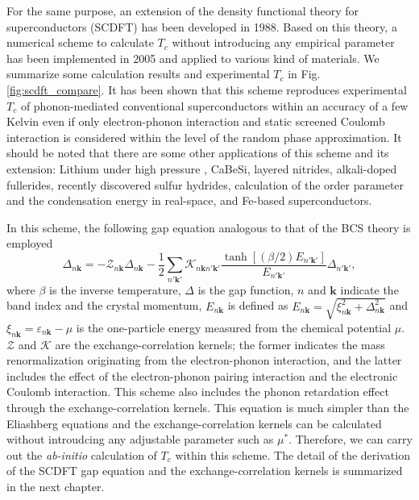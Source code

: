 For the same purpose, an extension of the density functional theory for superconductors (SCDFT)
has been developed in 1988\cite{Oliveira1988}. Based on this theory, a numerical scheme to calculate
$T_c$ without introducing any empirical parameter has been implemented in 2005\cite{Luders2005} 
and applied to various kind of materials. We summarize some calculation results and experimental 
$T_c$ in Fig.\ref{fig:scdft_compare}. It has been shown that this scheme reproduces experimental $T_c$ 
of phonon-mediated conventional superconductors within an accuracy of a few Kelvin even if only electron-phonon 
interaction and static screened Coulomb interaction is considered within the level of the random
phase approximation.
It should be noted that there are some other applications of this scheme and its extension: 
Lithium under high pressure
\cite{Profeta2006Pressure, RA2013}, CaBeSi\cite{Bersier2009CaBeSi}, layered nitrides\cite{RA2012}, 
alkali-doped fullerides\cite{RA2013alkali}, recently discovered sulfur hydrides\cite{Flores2016,RA2015,Errea2015},
calculation of the order parameter and the condensation energy in real-space\cite{Linscheid2015},
and Fe-based superconductors\cite{Essenberger2016}.

In this scheme, the following gap equation analogous to that of the BCS theory is employed
%
\begin{equation}
	\Delta_{n \bm k} = -{\mathcal Z}_{n \bm k}\Delta_{n \bm k} - \frac{1}{2}
	\sum_{n' \bm k'} {\mathcal K}_{n \bm k n' \bm k'} \frac{\tanh[(\beta/2)E_{n' \bm k'}]}
	{E_{n' \bm k'}} \Delta_{n' \bm k'},
	\label{eq:gapeqintro}
\end{equation}
%
where $\beta$ is the inverse temperature, $\Delta$ is the gap function,
$n$ and $\bm k$ indicate the band index and the crystal momentum, 
$E_{n \bm k} $ is defined as $E_{n\bm k} = \sqrt{\xi_{n\bm k}^2 + \Delta_{n \bm k}^2}$ and 
$\xi_{n\bm k} = \varepsilon_{n\bm k} - \mu$ is the one-particle energy measured from the chemical
potential $\mu$. $\mathcal Z$ and $\mathcal K$ are the exchange-correlation kernels; the former
indicates the mass renormalization originating from the electron-phonon interaction, and the latter
includes the effect of the electron-phonon pairing interaction and the electronic Coulomb interaction.
This scheme also includes the phonon retardation effect through the exchange-correlation kernels.
This equation is much simpler than the Eliashberg equations and the exchange-correlation kernels 
can be calculated without introudcing any adjustable parameter such as $\mu^{\ast}$.
Therefore, we can carry out the {\it ab-initio} calculation of $T_c$ within this scheme.
The detail of the derivation of the SCDFT gap equation and the exchange-correlation kernels is 
summarized in the next chapter.

